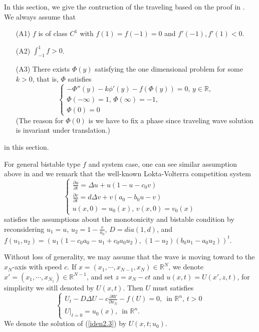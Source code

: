 \documentclass[12pt, a4paper]{article}
\numberwithin{equation}{section}
\newcommand{\R}{\mathbb{R}}
\newcommand{\pd}[2]{\frac{\partial #1}{\partial #2}}
\begin{document}
\begin{CJK}{UTF8}{bkai}
	In this section, we give the contruction of the traveling based on the proof in \cite{KT2011}. We always assume that
\begin{enumerate}
	\item[(A1)]  $f$ is of class $C^1$ with $f(1)=f(-1)=0$ and $f'(-1),f'(1)<0$.
	\item[(A2)] $\int_{-1}^1f>0$.
	\item[(A3)] There exists $\Phi(y)$ satisfying the one dimensional problem for some $k>0$, that is, $\Phi$ satisfies
	\begin{equation}\label{iden2.1}
	\begin{cases}
		-\Phi''(y)-k\phi'(y)-f(\Phi(y))=0,\,y\in\R,\\
		\Phi(-\infty)=1,\,\Phi(\infty)=-1,\\
		\Phi(0)=0
	\end{cases}
	\end{equation}
	(The reason for $\Phi(0)$ is we have to fix a phase since traveling wave solution is invariant under translation.)
\end{enumerate}
in this section.


	For general bistable type $f$ and system case, one can see similar assumption above in \cite{NT2013} and we remark that the well-known Lokta-Volterra competition system 
\begin{equation}
\begin{cases}
	\pd{u}{t}=\Delta u+u(1-u-c_0v)\\
	\pd{v}{t}=d\Delta v+v(a_0-b_0u-v)\\
	u(x,0)=u_0(x),\,v(x,0)=v_0(x)
\end{cases}
\end{equation}
satisfies the assumptions about the monotonicity and bistable condition by reconsidering $u_1=u$, $u_2=1-\frac{v}{a_0}$, $D=dia(1,d)$, and $f(u_1,u_2)=(u_1(1-c_0a_0-u_1+c_0a_0u_2),\,(1-u_2)(b_0u_1-a_0u_2))^t$.


	Without loss of generality, we may assume that the wave is moving toward to the $x_N$-axis with speed $c$. If $x=(x_1,\cdots,x_{N-1},x_N)\in\R^N$, we denote $x'=(x_1,\cdots,x_{N_1})\in\R^{N-1}$, and set $z=x_N-ct$ and $u(x,t)=U(x',z,t)$, for simplicity we sitll denoted by $U(x,t)$. Then $U$ must satisfies
\begin{equation}\label{iden2.3}
\begin{cases}
	U_t-D\Delta U-c\pd{W}{x_N}-f(U)=0,\,\mbox{ in }\R^n,\,t>0\\
	U\big|_{t=0}=u_0(x),\,\mbox{ in }\R^n.
\end{cases}
\end{equation}
We denote the solution of (\ref{iden2.3}) by $U(x,t;u_0)$.



\end{CJK}
\end{document}
